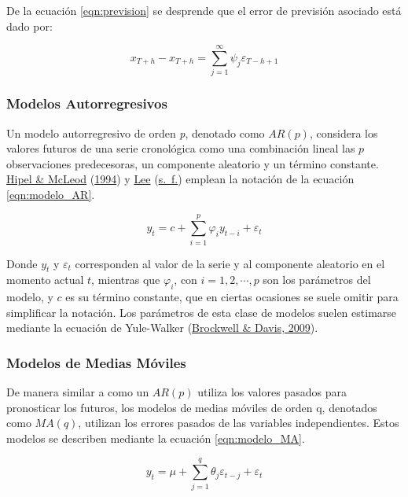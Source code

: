 \documentclass[
]{article}
\begin{document}
De la ecuación \ref{eqn:prevision} se desprende que el error de
previsión asociado está dado por:

\begin{equation}
\label{eqn:error_prevision}
x_{T+h}- \hat x_{T+h}=\sum_{j=1}^{\infty} \psi_j \varepsilon_{T-h+1}
\end{equation}

\subsubsection{Modelos Autorregresivos}

Un modelo autorregresivo de orden \emph{p}, denotado como \(AR(p)\),
considera los valores futuros de una serie cronológica como una
combinación lineal las \(p\) observaciones predecesoras, un componente
aleatorio y un término constante. \protect\hyperlink{ref-Hipel}{Hipel \&
McLeod} (\protect\hyperlink{ref-Hipel}{1994}) y
\protect\hyperlink{ref-Lee}{Lee} (\protect\hyperlink{ref-Lee}{s.~f.})
emplean la notación de la ecuación \ref{eqn:modelo_AR}.

\begin{equation}
\label{eqn:modelo_AR}
y_t=c+\sum_{i=1}^p \varphi_iy_{t-i}+\varepsilon_t
\end{equation}

Donde \(y_t\) y \(\varepsilon_t\) corresponden al valor de la serie y al
componente aleatorio en el momento actual \(t\), mientras que
\(\varphi_i\), con \(i=1,2,\cdots,p\) son los parámetros del modelo, y
\(c\) es su término constante, que en ciertas ocasiones se suele omitir
para simplificar la notación. Los parámetros de esta clase de modelos
suelen estimarse mediante la ecuación de Yule-Walker
(\protect\hyperlink{ref-yule.walker}{Brockwell \& Davis, 2009}).

\subsubsection{Modelos de Medias Móviles}

De manera similar a como un \(AR(p)\) utiliza los valores pasados para
pronosticar los futuros, los modelos de medias móviles de orden q,
denotados como \(MA(q)\), utilizan los errores pasados de las variables
independientes. Estos modelos se describen mediante la ecuación
\ref{eqn:modelo_MA}.

\begin{equation}
\label{eqn:modelo_MA}
y_t=\mu+\sum_{j=1}^q \theta_j \varepsilon_{t-j}+\varepsilon_t
\end{equation}
\end{document}
